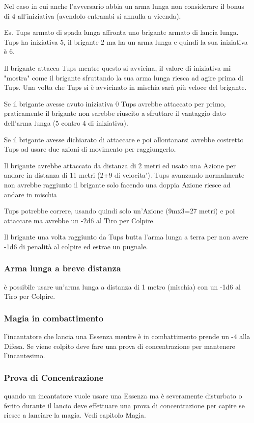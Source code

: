 \documentclass[a4paper,11pt,twoside,openany]{book}
\begin{document}
Nel caso in cui anche l'avversario abbia un arma lunga non considerare il bonus di 4 all'iniziativa (avendolo entrambi si annulla a vicenda).

Es. Tups armato di spada lunga affronta uno brigante armato di lancia lunga. Tups ha iniziativa 5, il brigante 2 ma ha un arma lunga e quindi la sua iniziativa è 6.

Il brigante attacca Tups mentre questo si avvicina, il valore di iniziativa mi "mostra" come il brigante sfruttando la sua arma lunga riesca ad agire prima di Tups. Una volta che Tups si è avvicinato in mischia sarà più veloce del brigante.

Se il brigante avesse avuto iniziativa 0 Tups avrebbe attaccato per primo, praticamente il brigante non sarebbe riuscito a sfruttare il vantaggio dato dell'arma lunga (5 contro 4 di iniziativa).

Se il brigante avesse dichiarato di attaccare e poi allontanarsi avrebbe costretto Tups ad usare due azioni di movimento per raggiungerlo.

Il brigante avrebbe attaccato da distanza di 2 metri ed usato una Azione per andare in distanza di 11 metri (2+9 di velocita'). Tups avanzando normalmente non avrebbe raggiunto il brigante solo facendo una doppia Azione riesce ad andare in mischia

Tups potrebbe correre, usando quindi solo un'Azione (9mx3=27 metri) e poi attaccare ma avrebbe un -2d6 al Tiro per Colpire.

Il brigante una volta raggiunto da Tups butta l'arma lunga a terra per non avere -1d6 di penalità al colpire ed estrae un pugnale.

\subsubsection{Arma lunga a breve distanza} è possibile usare un'arma lunga a distanza di 1 metro (mischia) con un -1d6 al Tiro per Colpire.

\subsubsection{Magia in combattimento} l'incantatore che lancia una Essenza mentre è in combattimento prende un -4 alla Difesa. Se viene colpito deve fare una prova di concentrazione per mantenere l'incantesimo.

\subsubsection{Prova di Concentrazione} quando un incantatore vuole usare una Essenza ma è severamente disturbato o ferito durante il lancio deve effettuare una prova di concentrazione per capire se riesce a lanciare la magia. Vedi capitolo Magia.
\end{document}
